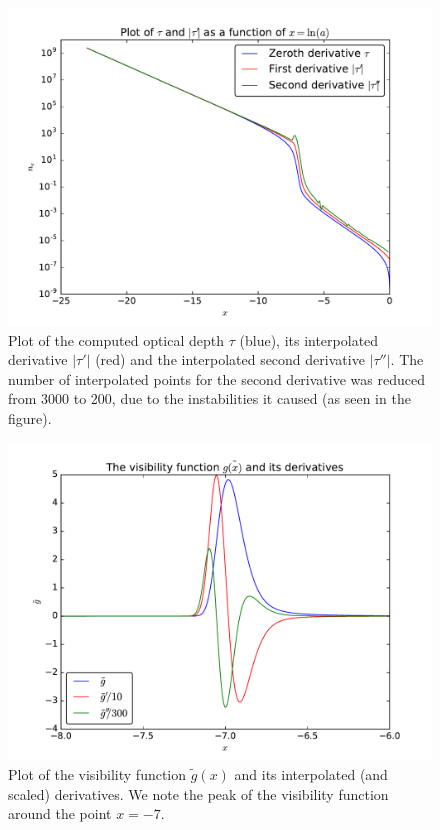 \documentclass[12pt]{article}
\begin{document}
\begin{figure}[H]
\centering
\includegraphics[width=\linewidth]{Plots/FirstDerivativeTau.pdf}
\caption{Plot of the computed optical depth $\tau$  (blue),  its interpolated derivative $|\tau'|$ (red) and the interpolated second derivative $|\tau''|$. The number of interpolated points for the second derivative was reduced from 3000 to 200, due to the instabilities it caused (as seen in the figure).}
\end{figure}

\begin{figure}[H]
\centering
\includegraphics[width=\linewidth]{Plots/VisibilityFunc.pdf}
\caption{Plot of the visibility function $\tilde{g}(x)$ and its interpolated (and scaled) derivatives. We note the peak of the visibility function around the point $x=-7$. }
\end{figure}
\end{document}

